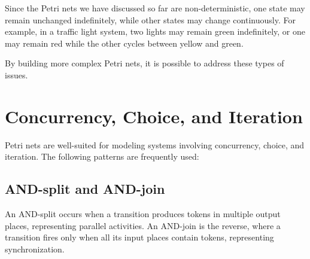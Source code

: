     Since the Petri nets we have discussed so far are non-deterministic, one state may remain unchanged indefinitely, while other states may change continuously. For example, in a traffic light system, two lights may remain green indefinitely, or one may remain red while the other cycles between yellow and green.
    
    By building more complex Petri nets, it is possible to address these types of issues.
    
    \section{Concurrency, Choice, and Iteration}
    
    Petri nets are well-suited for modeling systems involving concurrency, choice, and iteration. The following patterns are frequently used:
    
    \subsection{AND-split and AND-join}
    An AND-split occurs when a transition produces tokens in multiple output places, representing parallel activities. An AND-join is the reverse, where a transition fires only when all its input places contain tokens, representing synchronization.
    
